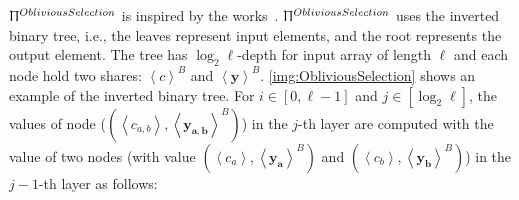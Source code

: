 

$\Uppi^{ObliviousSelection}$ is inspired by the works~\cite{jarvinen2019pilot,mohassel2020practical}. $\Uppi^{ObliviousSelection}$ uses the inverted binary tree, i.e., the leaves represent input elements, and the root represents the output element. The tree has $\log_2{\ell}$-depth for input array of length $\ell$ and each node hold two shares: $\left\langle c\right\rangle^B $ and $\left\langle \boldsymbol{y}\right\rangle ^{B} $. \autoref{img:ObliviousSelection} shows an example of the inverted binary tree. For $i\in \left[0,\ell-1\right] $ and $j\in \left[\log_2 \ell\right] $, the values of node ($\left(\left\langle c_{a,b}\right\rangle , \left\langle \boldsymbol{y_{a,b}}\right\rangle ^{B}\right) $) in the $j$-th layer are computed with the value of two nodes (with value $\left(\left\langle c_{a}\right\rangle , \left\langle \boldsymbol{y_{a}}\right\rangle ^{B}\right)$  and $\left(\left\langle c_{b}\right\rangle , \left\langle \boldsymbol{y_{b}}\right\rangle ^{B}\right) $) in the $j-1$-th layer as follows:

